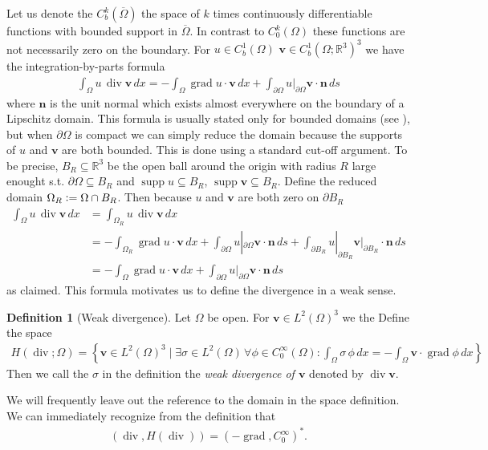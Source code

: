 \documentclass[12pt,a4paper]{article}
\numberwithin{equation}{subsection}
\numberwithin{lemma}{subsection}
\theoremstyle{definition}
\newtheorem{definition}[lemma]{Definition}
\DeclareMathOperator{\diver}{div}
\DeclareMathOperator{\grad}{grad}
\DeclareMathOperator{\supp}{supp}
\newcommand{\real}{\mathbb{R}}
\begin{document}
Let us denote the $C^k_b(\overline{\Omega})$ the space of $k$ times continuously
differentiable functions with bounded support in $\overline{\Omega}$. 
In contrast to $C^k_0(\Omega)$ these functions are not necessarily zero on the 
boundary.
For $u \in C_b^1(\Omega)$ $\mathbf{v} \in C_b^1(\Omega;\real^3)^3$ we 
have the integration-by-parts formula
\begin{align}
    \int_\Omega u \, \diver \mathbf{v} \, dx
    = - \int_\Omega \grad u \cdot \mathbf{v} \, dx
        + \int_{\partial \Omega} u|_{\partial \Omega} \mathbf{v}\cdot\mathbf{n} \, ds
        \label{eq:integration_by_parts_C1}
\end{align}
where $\mathbf{n}$ is the unit normal which exists almost everywhere on the boundary of a 
Lipschitz domain. This formula is usually stated only for 
bounded domains (see \cite[Cor.\,3.20]{monk}), but when $\partial \Omega$ is compact 
we can simply reduce the domain 
because the supports of $u$ and $\mathbf{v}$ are both bounded. This is done using 
a standard cut-off argument.
To be precise, $B_R \subseteq \real^3$ be the open ball around the origin 
with radius $R$ large enought s.t. $\partial \Omega \subseteq B_R$ and 
$\supp u \subseteq B_R$, $\supp \mathbf{v} \subseteq B_R$.
Define the reduced domain $\Omega_R \vcentcolon= \Omega \cap B_R$. 
Then because $u$ and $\mathbf{v}$ are both zero on $\partial B_R$
\begin{align*}
    \int_\Omega u \, \diver \mathbf{v} \, dx
    &= \int_{\Omega_R} u \, \diver \mathbf{v} \, dx
    \\ &= - \int_{\Omega_R} \grad u \cdot \mathbf{v} \, dx
        + \int_{\partial \Omega} u|_{\partial \Omega} \mathbf{v}\cdot\mathbf{n} \, ds
        + \int_{\partial B_R} u|_{\partial B_R} \mathbf{v}|_{\partial B_R} \cdot\mathbf{n} \, ds
    \\ &= - \int_\Omega \grad u \cdot \mathbf{v} \, dx
        + \int_{\partial \Omega} u|_{\partial \Omega} \mathbf{v}\cdot\mathbf{n} \, ds
\end{align*}
as claimed. This formula motivates us to define the divergence in a
weak sense.

\begin{definition}[Weak divergence]
    Let $\Omega$ be open. For $\mathbf{v} \in L^2(\Omega)^3$ we the  
    Define the space
    \begin{align*}
        H(\diver;\Omega) = \left\{ \mathbf{v} \in L^2(\Omega)^3 \mid
            \exists \sigma \in L^2(\Omega)\, \forall \phi \in C_0^\infty(\Omega) :  
            \int_\Omega \sigma \, \phi \, dx = -\int_\Omega \mathbf{v} \cdot \grad \phi \, dx \right\}
    \end{align*}
    Then we call the $\sigma$ in the definition the \textit{weak divergence of $\mathbf{v}$}
    denoted by $\diver \mathbf{v}$.
\end{definition}
We will frequently leave out the reference to the domain in the space definition.
We can immediately recognize from the definition that 
\begin{align}
    (\diver, H(\diver)) = (-\grad, C_0^\infty)^*. \label{eq:adjoint_grad_c0inf}
\end{align}
\end{document}

